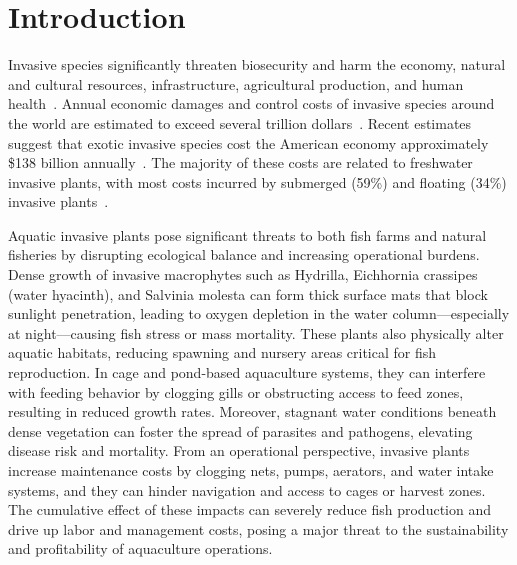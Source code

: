 \documentclass[final,3p,times,twocolumn]{elsarticle}
\begin{document}
\section{Introduction}
\label{sec:intro}



Invasive species significantly threaten biosecurity and harm the economy, natural and cultural resources, infrastructure, agricultural production, and human health~\cite{tasker2024nuanced, macedo2024economic, shen2024typical}. Annual economic damages and control costs of invasive species around the world are estimated to exceed several trillion dollars~\cite{vaissiere2022nature, macedo2024economic, cuthbert2021global}. Recent estimates suggest that exotic invasive species cost the American economy approximately \$138 billion annually~\cite{pimentel2000environmental, lovell2006economic, warziniack2021economics, macedo2024economic}. The majority of these costs are related to freshwater invasive plants, with most costs incurred by submerged (59\%) and floating (34\%) invasive plants~\cite{macedo2024economic}.


Aquatic invasive plants pose significant threats to both fish farms and natural fisheries by disrupting ecological balance and increasing operational burdens. Dense growth of invasive macrophytes such as Hydrilla, Eichhornia crassipes (water hyacinth), and Salvinia molesta can form thick surface mats that block sunlight penetration, leading to oxygen depletion in the water column—especially at night—causing fish stress or mass mortality. These plants also physically alter aquatic habitats, reducing spawning and nursery areas critical for fish reproduction. In cage and pond-based aquaculture systems, they can interfere with feeding behavior by clogging gills or obstructing access to feed zones, resulting in reduced growth rates. Moreover, stagnant water conditions beneath dense vegetation can foster the spread of parasites and pathogens, elevating disease risk and mortality. From an operational perspective, invasive plants increase maintenance costs by clogging nets, pumps, aerators, and water intake systems, and they can hinder navigation and access to cages or harvest zones. The cumulative effect of these impacts can severely reduce fish production and drive up labor and management costs, posing a major threat to the sustainability and profitability of aquaculture operations.
\end{document}
